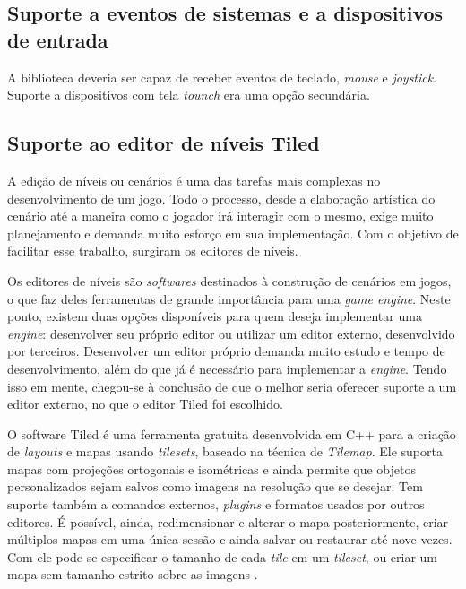 \subsection{Suporte a eventos de sistemas e a dispositivos de entrada}
%
A biblioteca deveria ser capaz de receber eventos de teclado, \textit{mouse} e \textit{joystick}. Suporte a dispositivos com tela \textit{tounch} era uma opção secundária.
%
\subsection{Suporte ao editor de níveis Tiled}
%
A edição de níveis ou cenários é uma das tarefas mais complexas no desenvolvimento de um jogo. Todo o processo, desde a elaboração artística do cenário até a maneira como o jogador irá interagir com o mesmo, exige muito planejamento e demanda muito esforço em sua implementação. Com o objetivo de facilitar esse trabalho, surgiram os editores de níveis. 
\par
Os editores de níveis são \textit{softwares} destinados à construção de cenários em jogos, o que faz deles ferramentas de grande importância para uma \textit{game engine}. Neste ponto, existem duas opções disponíveis para quem deseja implementar uma \textit{engine}: desenvolver seu próprio editor ou utilizar um editor externo, desenvolvido por terceiros. Desenvolver um editor próprio demanda muito estudo e tempo de desenvolvimento, além do que já é necessário para implementar a \textit{engine}. Tendo isso em mente, chegou-se à conclusão de que o melhor seria oferecer suporte a um editor externo, no que o editor Tiled foi escolhido. 
\par
O software Tiled \cite{SiteTiled} é uma ferramenta gratuita desenvolvida em C++ para a criação de \textit{layouts} e mapas usando \textit{tilesets}, baseado na técnica de \textit{Tilemap}. Ele suporta mapas com projeções ortogonais e isométricas e ainda permite que objetos personalizados sejam salvos como imagens na resolução que se desejar. Tem suporte também a comandos externos, \textit{plugins} e formatos usados por outros editores. É possível, ainda, redimensionar e alterar o mapa posteriormente, criar múltiplos mapas em uma única sessão e ainda salvar ou restaurar até nove vezes. Com ele pode-se especificar o tamanho de cada \textit{tile} em um \textit{tileset}, ou criar um mapa sem tamanho estrito sobre as imagens \cite{TiledTutorial}.
%
